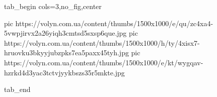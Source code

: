  
 
 
 
 


\ifcmt
  tab_begin cols=3,no_fig,center

     pic https://volyn.com.ua/content/thumbs/1500x1000/e/qu/zc4xa4-5vwpjirvx2a26yiqh3cmtsd5sxsp6que.jpg
		 pic https://volyn.com.ua/content/thumbs/1500x1000/h/ty/4xisx7-hruovku3bkyyjubzpks7ea5paxx45tyh.jpg
		 pic https://volyn.com.ua/content/thumbs/1500x1000/e/kt/wygqav-hzrkd4d3yac3tctvjyykbszs35r5mkte.jpg

  tab_end
\fi
